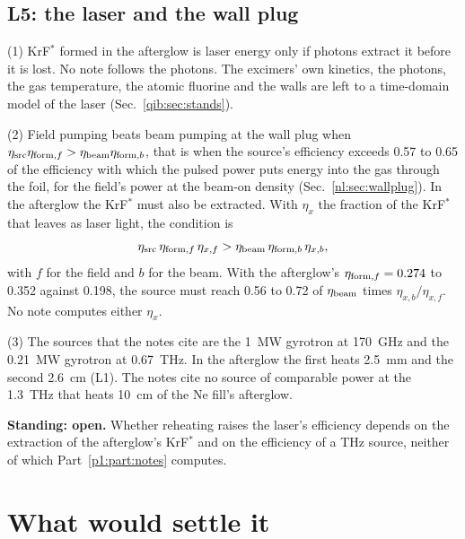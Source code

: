 \section{L5: the laser and the wall plug}
\label{p1:sec:L5}

{\noindent}(1) KrF$^*$ formed in the afterglow is laser energy only if photons extract
it before it is lost. No note follows the photons. The excimers' own kinetics, the
photons, the gas temperature, the atomic fluorine and the walls are left to a
time-domain model of the laser (Sec.~\ref{qib:sec:stands}).

{\noindent}(2) Field pumping beats beam pumping at the wall plug when
$\eta_{\rm src}\eta_{{\rm form},f}>\eta_{\rm beam}\eta_{{\rm form},b}$, that is when the
source's efficiency exceeds 0.57 to 0.65 of the efficiency with which the pulsed power
puts energy into the gas through the foil, for the field's power at the beam-on density
(Sec.~\ref{nl:sec:wallplug}). In the afterglow the KrF$^*$ must also be extracted. With
$\eta_x$ the fraction of the KrF$^*$ that leaves as laser light, the condition is
\begin{equation}
\eta_{\rm src}\,\eta_{{\rm form},f}\,\eta_{x,f}>\eta_{\rm beam}\,\eta_{{\rm form},b}\,\eta_{x,b},
\label{p1:eq:wallplug}
\end{equation}
with $f$ for the field and $b$ for the beam. With the afterglow's
$\eta_{{\rm form},f}=0.274$ to 0.352 against 0.198, the source must reach 0.56 to 0.72
of $\eta_{\rm beam}$ times $\eta_{x,b}/\eta_{x,f}$. No note computes either $\eta_x$.

{\noindent}(3) The sources that the notes cite are the 1~MW gyrotron at 170~GHz and the
0.21~MW gyrotron at 0.67~THz. In the afterglow the first heats 2.5~mm and the second
2.6~cm (L1). The notes cite no source of comparable power at the 1.3~THz that heats
10~cm of the Ne fill's afterglow.

\medskip
\noindent\textbf{Standing: open.} Whether reheating raises the laser's efficiency
depends on the extraction of the afterglow's KrF$^*$ and on the efficiency of a THz
source, neither of which Part~\ref{p1:part:notes} computes.


\chapter{What would settle it}
\label{p1:chap:settle}

